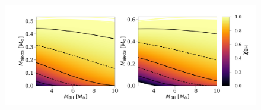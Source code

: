 \documentclass[a4paper,fleqn,usenatbib,useAMS,usedcolumn]{mnras}
\begin{document}

%
\begin{figure}
	\includegraphics[width=1\textwidth]{../PlottingScripts/imagesUFDandRatios/PredictedMej.png} %
    \caption{}
    \label{fig:PredictedMej}
\end{figure}
%
\end{document}

